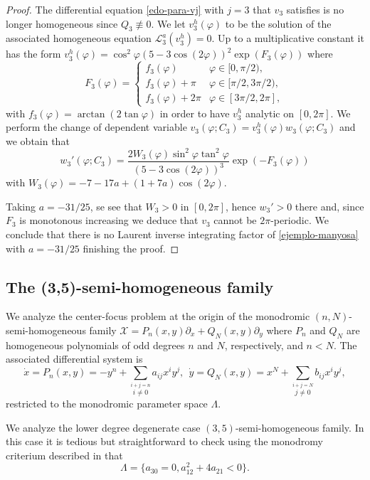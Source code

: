 \documentclass[12pt]{amsart}
\begin{document}
\begin{proof}
The differential equation \eqref{edo-para-vj} with $j=3$ that $v_3$ satisfies is no longer homogeneous since $Q_3 \not\equiv 0$. We let $v_3^h(\varphi)$ to be the solution of the associated homogeneous equation $\mathcal{L}^{a}_3(v_3^h) = 0$. Up to a multiplicative constant it has the form $v_3^h(\varphi) = \cos^2\varphi  (5 - 3 \cos(2 \varphi))^2  \exp(F_3(\varphi))$ where
$$
F_3(\varphi) = \begin{cases}
f_3(\varphi) & \varphi \in [0, \pi/2), \\
f_3(\varphi) + \pi & \varphi \in [\pi/2, 3\pi/2), \\
f_3(\varphi) + 2\pi & \varphi \in [3\pi/2, 2\pi],
\end{cases}
$$
with $f_3(\varphi) = \arctan(2 \tan\varphi)$ in order to have $v_3^h$ analytic on $[0, 2 \pi]$. We perform the change of dependent variable $v_3(\varphi; C_3) = v_3^h(\varphi) w_3(\varphi; C_3)$ and we obtain that
$$
w_3'(\varphi; C_3) = \frac{2 W_3(\varphi) \sin^2\varphi \tan^2\varphi}{(5 - 3 \cos(2 \varphi))^3} \exp(-F_3(\varphi))
$$
with $W_3(\varphi) = -7 - 17 a + (1 + 7 a) \cos(2 \varphi)$.

Taking $a = -31/25$, se see that $W_3 > 0$ in $[0, 2 \pi]$, hence $w_3' > 0$ there and, since $F_3$ is monotonous increasing we deduce that $v_3$ cannot be $2 \pi$-periodic. We conclude that there is no Laurent inverse integrating factor of \eqref{ejemplo-manyosa} with $a=-31/25$ finishing the proof.
\end{proof}


\subsection{The (3,5)-semi-homogeneous family}

We analyze the center-focus problem at the origin of the monodromic $(n, N)$-semi-homogeneous family $\mathcal{X} = P_n(x,y) \partial_x + Q_N(x,y) \partial_y$ where $P_n$ and $Q_N$ are homogeneous polynomials of odd degrees $n$ and $N$, respectively, and $n< N$. The associated differential system is
\begin{equation}\label{semi-mM}
\dot{x} = P_n(x,y) = -y^n + \sum_{\stackrel{i+j=n}{\scriptscriptstyle i \neq 0}} a_{ij} x^i y^j, \ \ \dot{y} = Q_N(x,y) = x^N + \sum_{\stackrel{i+j=N}{\scriptscriptstyle j \neq 0}} b_{ij} x^i y^j,
\end{equation}
restricted to the monodromic parameter space $\Lambda$.

We analyze the lower degree degenerate case $(3, 5)$-semi-homogeneous family. In this case it is tedious but straightforward to check using the monodromy criterium described in \cite{AGR,AGR2} that
\begin{equation}\label{Lambda-35}
\Lambda = \{  a_{30} = 0, a_{12}^2 + 4 a_{21} < 0 \}.
\end{equation}
\end{document}

